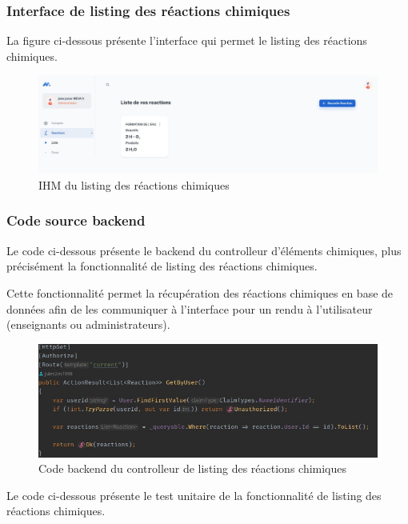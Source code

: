 \subsubsection{Interface de listing des réactions chimiques}

La figure ci-dessous présente l'interface qui permet le listing des réactions chimiques. 

\begin{figure}[H]
	\centering
	\includegraphics[width=1\textwidth]{img/ilrc}
	\caption{IHM du listing des réactions chimiques}
\end{figure}

\subsubsection{Code source backend}

Le code ci-dessous présente le backend du controlleur d'éléments chimiques, plus précisément la fonctionnalité de listing des réactions chimiques.

Cette fonctionnalité permet la récupération des réactions chimiques en base de données afin de les communiquer à l'interface pour un rendu à l'utilisateur (enseignants ou administrateurs).

\begin{figure}[H]
	\centering
	\includegraphics[width=1\textwidth]{img/clrea}
	\caption{Code backend du controlleur de listing des réactions chimiques}
\end{figure}

Le code ci-dessous présente le test unitaire de la fonctionnalité de listing des réactions chimiques.

